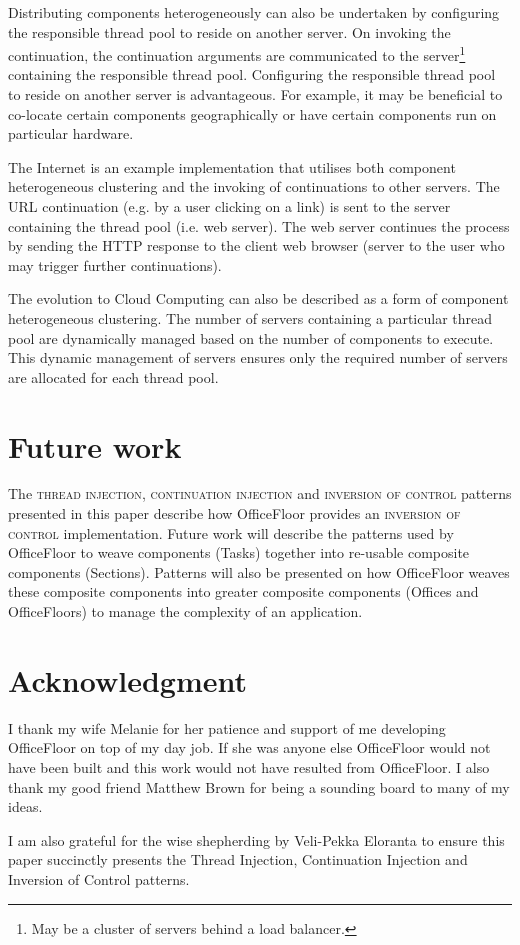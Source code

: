 \documentclass[prodmode]{style/acmlarge}
\begin{document}
Distributing components heterogeneously can also be undertaken by configuring
the responsible thread pool to reside on another server.  On invoking the
continuation, the continuation arguments are communicated to the
server\footnote{May be a cluster of servers behind a load balancer.} containing
the responsible thread pool.  Configuring the responsible thread pool to reside
on another server is advantageous.  For example, it may be beneficial to
co-locate certain components geographically or have certain components run on
particular hardware.

The Internet is an example implementation that utilises both component
heterogeneous clustering and the invoking of continuations to other servers. 
The URL continuation (e.g. by a user clicking on a link) is sent to the server
containing the thread pool (i.e. web server).  The web server continues the
process by sending the HTTP response to the client web browser (server to the
user who may trigger further continuations).

The evolution to Cloud Computing can also be described as a form of component
heterogeneous clustering.  The number of servers containing a particular thread
pool are dynamically managed based on the number of components to execute.  This
dynamic management of servers ensures only the required number of servers are
allocated for each thread pool.



\section{Future work}

The \textsc{thread injection}, \textsc{continuation injection} and
\textsc{inversion of control} patterns presented in this paper describe how
OfficeFloor \cite{officefloor} provides an \textsc{inversion of control}
implementation.  Future work will describe the patterns used by OfficeFloor to
weave components (Tasks) together into re-usable composite components
(Sections).  Patterns will also be presented on how OfficeFloor weaves these
composite components into greater composite components (Offices and
OfficeFloors) to manage the complexity of an application.



\section*{Acknowledgment} I thank my wife Melanie for her patience and support
of me developing OfficeFloor on top of my day job.  If she was anyone else
OfficeFloor would not have been built and this work would not have resulted from
OfficeFloor.  I also thank my good friend Matthew Brown for being a sounding
board to many of my ideas.

I am also grateful for the wise shepherding by Veli-Pekka Eloranta to ensure
this paper succinctly presents the Thread Injection, Continuation Injection and
Inversion of Control patterns.




\end{document}
